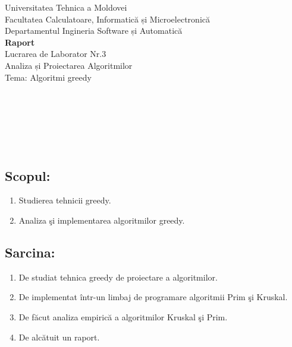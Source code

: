 \documentclass[14pt,a4paper]{extreport}
\begin{document}
\begin{titlepage}
\begin{center}
	{\large{ Universitatea Tehnica a Moldovei \\}}
	{\large{ Facultatea Calculatoare, Informatică și Microelectronică \\}}
	{\large{ Departamentul Ingineria Software și Automatică \\}}
	\vspace{4cm}
	{\LARGE {\bf{ Raport }}}\\
	\vspace{1cm}
	{\large { Lucrarea de Laborator Nr.3 \\}}
	{\large { Analiza și Proiectarea Algoritmilor \\}}
	{\large { Tema: Algoritmi greedy  \\}}
\end{center}

\vspace{5cm}

 \\
 \\
\noindent{\null} \\
 \\
 \\

\vspace{5cm}

\end{titlepage}


\clearpage
\subsection*{Scopul:\\}
\begin{enumerate}
	\item Studierea tehnicii greedy. 
	\item Analiza şi implementarea algoritmilor greedy. 
\end{enumerate}

\subsection*{Sarcina:}
\begin{enumerate}
	\item De studiat tehnica greedy de proiectare a algoritmilor. 
	\item De implementat într-un limbaj de programare algoritmii Prim şi Kruskal. 
	\item De făcut analiza empirică a algoritmilor Kruskal şi Prim. 
	\item De alcătuit un raport. 
\end{enumerate}
 
\end{document}
